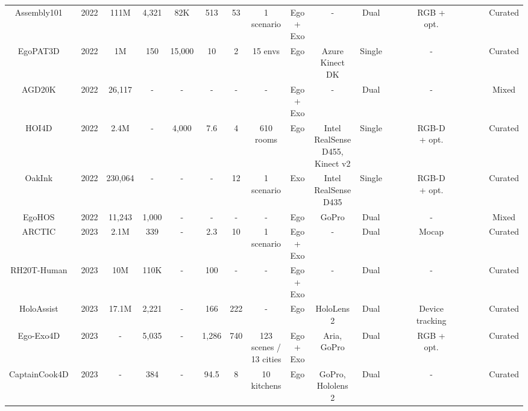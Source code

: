 \documentclass[Afour,sageh,times]{sagej}
\newcommand{\cmark}{\ding{51}}
\newcommand{\xmark}{\ding{55}}
\begin{document}
\begin{table}
\begin{tabular}{cccccccccccccccccccc}
Assembly101~\citep{sener2022assembly101} & 2022 & 111M & 4,321 & 82K & 513 & 53 & 1 scenario & Ego + Exo & - & Dual & \xmark & \cmark & \cmark & RGB + opt. & \xmark & \xmark & \xmark & \xmark & Curated \\
EgoPAT3D~\citep{li2022egocentric} & 2022 & 1M & 150 & 15,000 & 10 & 2 & 15 envs & Ego & Azure Kinect DK & Single & \xmark & \xmark & \xmark & - & \cmark & \xmark & \cmark & \xmark & Curated \\
AGD20K~\citep{luo2022grounded} & 2022 & 26,117 & - & - & - & - & - & Ego + Exo & - & Dual & \xmark & \xmark & \xmark & - & \xmark & \xmark & \xmark & \xmark & Mixed \\
HOI4D~\citep{liu2022hoi4d} & 2022 & 2.4M & - & 4,000 & 7.6 & 4 & 610 rooms & Ego & \makecell[c]{Intel RealSense D455,\\ Kinect v2} & Single & \cmark & \cmark & \cmark & RGB-D + opt. & \cmark & \xmark & \xmark & \xmark & Curated \\
OakInk~\citep{yang2022oakink} & 2022 & 230,064 & - & - & - & 12 & 1 scenario & Exo & Intel RealSense D435 & Single & \xmark & \cmark & \cmark & RGB-D + opt. & \cmark & \xmark & \xmark & \xmark & Curated \\
EgoHOS~\citep{zhang2022fine} & 2022 & 11,243 & 1,000 & - & - & - & - & Ego & GoPro & Dual & \cmark & \xmark & \xmark & - & \xmark & \xmark & \xmark & \xmark & Mixed \\
ARCTIC~\citep{fan2023arctic} & 2023 & 2.1M & 339 & - & 2.3 & 10 & 1 scenario & Ego + Exo & - & Dual & \xmark & \cmark & \cmark & Mocap & \xmark & \xmark & \xmark & \xmark & Curated \\
RH20T-Human~\citep{fang2023rh20t} & 2023 & 10M & 110K & - & 100 & - & - & Ego + Exo & - & Dual & \xmark & \xmark & \xmark & - & \cmark & \xmark & \cmark & \cmark & Curated \\
HoloAssist~\citep{wang2023holoassist} & 2023 & 17.1M & 2,221 & - & 166 & 222 & - & Ego & HoloLens 2 & Dual & \xmark & \cmark & \cmark & Device tracking & \cmark & \cmark & \cmark & \cmark & Curated \\
Ego-Exo4D~\citep{grauman2023ego} & 2023 & - & 5,035 & - & 1,286 & 740 & \makecell[c]{123 scenes /\\ 13 cities} & Ego + Exo & \makecell[c]{Aria,\\ GoPro} & Dual & \cmark & \cmark & \cmark & RGB + opt. & \cmark & \cmark & \cmark & \cmark & Curated \\
CaptainCook4D~\citep{peddi2024captaincook4d} & 2023 & - & 384 & - & 94.5 & 8 & 10 kitchens & Ego & GoPro, Hololens 2 & Dual & \xmark & \xmark & \xmark & - & \cmark & \xmark & \cmark & \cmark & Curated \\

\end{tabular}
\end{table}
\end{document}
